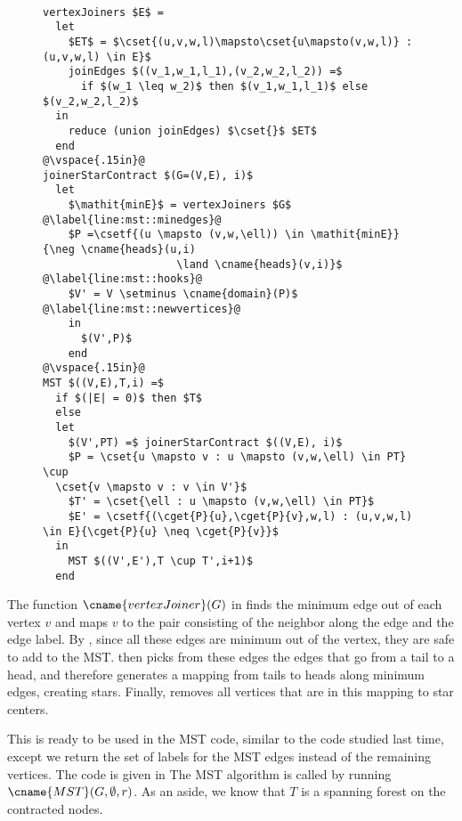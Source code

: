 \begin{figure}
\begin{algorithm}~
\label{alg:mst::starBoruvka}
\begin{lstlisting}
vertexJoiners $E$ =
  let
    $ET$ = $\cset{(u,v,w,l)\mapsto\cset{u\mapsto(v,w,l)} : (u,v,w,l) \in E}$
    joinEdges $((v_1,w_1,l_1),(v_2,w_2,l_2)) =$
      if $(w_1 \leq w_2)$ then $(v_1,w_1,l_1)$ else $(v_2,w_2,l_2)$ 
  in 
    reduce (union joinEdges) $\cset{}$ $ET$
  end 
@\vspace{.15in}@
joinerStarContract $(G=(V,E), i)$
  let
    $\mathit{minE}$ = vertexJoiners $G$          @\label{line:mst::minedges}@
    $P =\csetf{(u \mapsto (v,w,\ell)) \in \mathit{minE}}{\neg \cname{heads}(u,i)
                     \land \cname{heads}(v,i)}$      @\label{line:mst::hooks}@
    $V' = V \setminus \cname{domain}(P)$     @\label{line:mst::newvertices}@
    in 
      $(V',P)$ 
    end
@\vspace{.15in}@
MST $((V,E),T,i) =$
  if $(|E| = 0)$ then $T$
  else 
  let
    $(V',PT) =$ joinerStarContract $((V,E), i)$
    $P = \cset{u \mapsto v : u \mapsto (v,w,\ell) \in PT} \cup
  \cset{v \mapsto v : v \in V'}$
    $T' = \cset{\ell : u \mapsto (v,w,\ell) \in PT}$
    $E' = \csetf{(\cget{P}{u},\cget{P}{v},w,l) : (u,v,w,l) \in E}{\cget{P}{u} \neq \cget{P}{v}}$
  in
    MST $((V',E'),T \cup T',i+1)$
  end
\end{lstlisting}
\end{algorithm}
\end{figure}

The function $\cname{vertexJoiner}(G)$ in 
finds the minimum edge out of each vertex $v$ and maps $v$ to the pair
consisting of the neighbor along the edge and the edge label.  By
, since all these edges are minimum out of the
vertex, they are safe to add to the MST.   then
picks from these edges the edges that go from a tail to a head, and
therefore generates a mapping from tails to heads along minimum edges,
creating stars.  Finally,  removes all
vertices that are in this mapping to star centers.

This is ready to be used in the MST code, similar to the
 code studied last time, except we return the set
of labels for the MST edges instead of the remaining vertices.   The
code is given in 
The MST algorithm is called by running $\cname{MST}(G, \emptyset, r)$.  As an 
aside, we know that $T$ is a spanning forest on the contracted nodes. 

